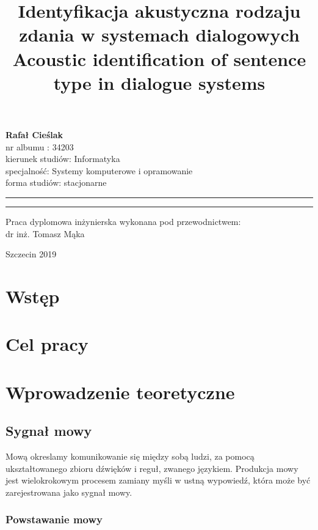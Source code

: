 \documentclass[a4paper,12 pt]{article}
\title{Identyfikacja akustyczna rodzaju zdania w systemach dialogowych	\newline \newline Acoustic identification of sentence type in dialogue systems	}
\makeatletter
\newcommand{\linia}{\rule{\linewidth}{0.4mm}}
\renewcommand{\maketitle}{\begin{titlepage}
    \vspace*{1cm}
    \begin{center}\small
   \textbf{ Rafał Cieślak}\\
    nr albumu : 34203\\
    kierunek studiów: Informatyka\\
    specjalność: Systemy komputerowe i opramowanie\\
    forma studiów: stacjonarne
    \end{center}
    \vspace{3cm}
    \noindent\linia
    \begin{center}
      \textbf{ \textsc{\@title}}
         \end{center}
     \linia
    \vspace{0.5cm}
    \begin{flushright}

    \vspace{5cm}
        \begin{center}\small
     {\small Praca dyplomowa inżynierska wykonana pod przewodnictwem:}\\
         dr inż. Tomasz Mąka
             \end{center}
     \end{flushright}
    \vspace*{\stretch{6}}
    \begin{center}
   Szczecin 2019
    \end{center}
  \end{titlepage}%
}
\makeatother
\begin{document}
\maketitle




\newpage
\tableofcontents
\listoffigures
\listoftables

\listofmycapequs

\newpage
\section{Wstęp}

\newpage
\section{Cel pracy}

\newpage
\section{Wprowadzenie teoretyczne}
\subsection{Sygnał mowy}
Mową okreslamy komunikowanie się między sobą ludzi, za pomocą ukształtowanego zbioru dźwięków i reguł, zwanego językiem.
Produkcja mowy jest wielokrokowym procesem zamiany myśli w ustną wypowiedź, która może być zarejestrowana jako sygnał mowy.
\subsubsection{Powstawanie mowy}
\end{document}
